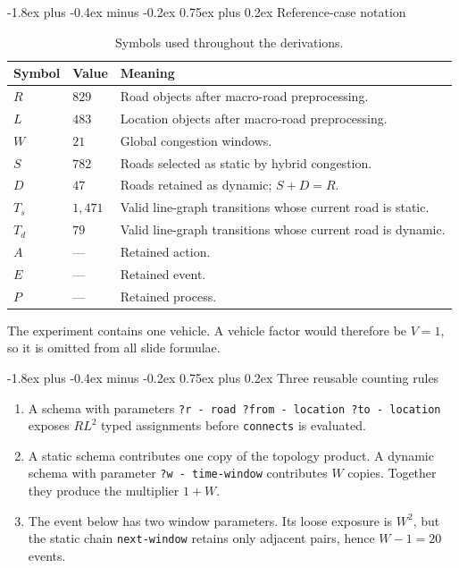 \documentclass[11pt,a4paper]{article}
\makeatletter
\renewcommand{\subsection}{\@startsection{subsection}{2}{0pt}
  {-1.8ex plus -0.4ex minus -0.2ex}
  {0.75ex plus 0.2ex}
  {\normalfont\large\bfseries\color{RoutlyNavy}}}
\makeatother
\begin{document}
\subsection{Reference-case notation}

\begin{table}[h]
\centering
\caption{Symbols used throughout the derivations.}
\begin{tabularx}{\textwidth}{@{}C{1.45cm}C{1.8cm}@{\hspace{0.8em}}Y@{}}
\toprule
\textbf{Symbol} & \textbf{Value} & \textbf{Meaning}\\
\midrule
\(R\)   & \(829\)   & Road objects after macro-road preprocessing.\\
\(L\)   & \(483\)   & Location objects after macro-road preprocessing.\\
\(W\)   & \(21\)    & Global congestion windows.\\
\(S\)   & \(782\)   & Roads selected as static by hybrid congestion.\\
\(D\)   & \(47\)    & Roads retained as dynamic; \(S+D=R\).\\
\(T_s\) & \(1{,}471\) & Valid line-graph transitions whose current road is static.\\
\(T_d\) & \(79\)    & Valid line-graph transitions whose current road is dynamic.\\
\(A\)   & --- & Retained action.\\
\(E\)   & --- & Retained event.\\
\(P\)   & --- & Retained process.\\
\bottomrule
\end{tabularx}
\end{table}

The experiment contains one vehicle. A vehicle factor would therefore be
\(V=1\), so it is omitted from all slide formulae.

\subsection{Three reusable counting rules}

\begin{enumerate}
  \item A schema with parameters
  \texttt{?r - road ?from - location ?to - location}
  exposes \(R L^2\) typed assignments before \texttt{connects} is evaluated.

  \item A static schema contributes one copy of the topology product. A
  dynamic schema with parameter \texttt{?w - time-window} contributes \(W\)
  copies. Together they produce the multiplier \(1+W\).

  \item The event below has two window parameters. Its loose exposure is
  \(W^2\), but the static chain \texttt{next-window} retains only adjacent
  pairs, hence \(W-1=20\) events.
\end{enumerate}
\end{document}
